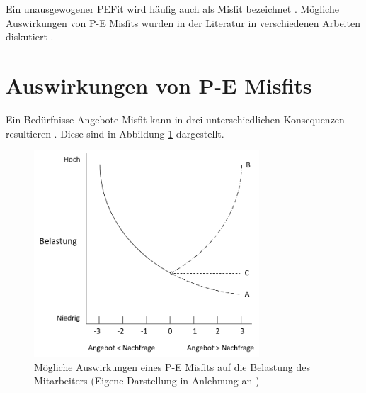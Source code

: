 Ein unausgewogener \ac{PEFit} wird häufig auch als Misfit bezeichnet \cite[S. 2]{edwards:2004}\cite[S. 28]{mechanismsOfJobStressAndStrain:1982}\cite[S. 4]{kristof:1996}. Mögliche Auswirkungen von P-E Misfits wurden in der Literatur in verschiedenen Arbeiten diskutiert \cite[S. 5f.]{caplan:1987}\cite[S. 21ff.]{edwards:2008}\cite[S. 28ff.]{mechanismsOfJobStressAndStrain:1982}\cite[S. 4ff.]{copingAndAdaption:1974}\cite[S. 9ff.]{harrison:1978}.

\section{Auswirkungen von P-E Misfits}
\label{ch:personEnvironmentFit:auswirkungenErhoehterAngebote}
Ein Bedürfnisse-Angebote Misfit kann in drei unterschiedlichen Konsequenzen resultieren \cite[S. 21ff.]{edwards:2008}\cite[S. 28ff.]{mechanismsOfJobStressAndStrain:1982}\cite[S. 9ff.]{harrison:1978}. Diese sind in Abbildung \ref{fig:personEnvironmentFit:auswirkungenErhoehterAngebote:abb1} dargestellt.

\begin{figure}[h]
	\centering
	\includegraphics[width=0.75\textwidth]{gfx/ueberschuss_supply_motive.png}
	\caption[Mögliche Auswirkungen eines P-E Misfits auf die Belastung des Mitarbeiters]{Mögliche Auswirkungen eines P-E Misfits auf die Belastung des Mitarbeiters (Eigene Darstellung in Anlehnung an \cite[S. 23]{edwards:2008})}
	\label{fig:personEnvironmentFit:auswirkungenErhoehterAngebote:abb1}
\end{figure}

